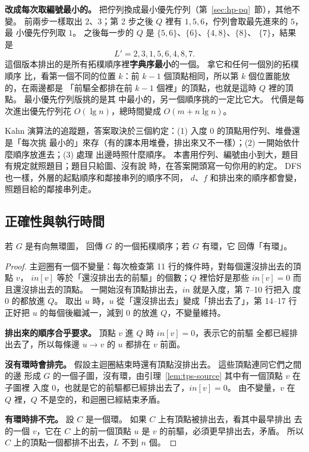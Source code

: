 \textbf{改成每次取編號最小的。} 把佇列換成最小優先佇列（第~\ref{sec:hp-pq}~節），其他不變。
前兩步一樣取出 $2$、$3$；第 2 步之後 $Q$ 裡有 $1, 5, 6$，佇列會取最先進來的 $5$，最
小優先佇列取 $1$。 之後每一步的 $Q$ 是 $\{5, 6\}$、$\{6\}$、$\{4, 8\}$、$\{8\}$、
$\{7\}$，結果是
\[
L' = 2, 3, 1, 5, 6, 4, 8, 7.
\]
這個版本排出的是所有拓樸順序裡\textbf{字典序最小}的一個。 拿它和任何一個別的拓樸順序
比，看第一個不同的位置 $k$：前 $k - 1$ 個頂點相同，所以第 $k$ 個位置能放的，在兩邊都是
「前驅全都排在前 $k - 1$ 個裡」的頂點，也就是這時 $Q$ 裡的頂點。 最小優先佇列版挑的是其
中最小的，另一個順序挑的一定比它大。 代價是每次進出優先佇列花 $O(\lg n)$，總時間變成
$O(m + n \lg n)$。

\begin{examnote}
Kahn 演算法的追蹤題，答案取決於三個約定：(1) 入度 $0$ 的頂點用佇列、堆疊還是「每次挑
最小的」來存（有的課本用堆疊，排出來又不一樣）；(2) 一開始依什麼順序放進去；(3) 處理
出邊時照什麼順序。 本書用佇列、編號由小到大，題目有規定就照題目；題目只給圖、沒有說
時，在答案開頭寫一句你用的約定。 DFS 也一樣，外層的起點順序和鄰接串列的順序不同，
$d$、$f$ 和排出來的順序都會變，照題目給的鄰接串列走。
\end{examnote}

\subsection{正確性與執行時間}

\begin{theorem}
\label{thm:tps-kahn}
若 $G$ 是有向無環圖， 回傳 $G$ 的一個拓樸順序；若 $G$ 有環，它
回傳「有環」。
\end{theorem}

\begin{proof}
主迴圈有一個不變量：每次檢查第 11 行的條件時，對每個還沒排出去的頂點 $v$，
$\mathit{in}[v]$ 等於「還沒排出去的前驅」的個數；$Q$ 裡恰好是那些 $\mathit{in}[v] = 0$
而且還沒排出去的頂點。 一開始沒有頂點排出去，$\mathit{in}$ 就是入度，第 7--10 行把入
度 $0$ 的都放進 $Q$。 取出 $u$ 時，$u$ 從「還沒排出去」變成「排出去了」，第 14--17 行
正好把 $u$ 的每個後繼減一，減到 $0$ 的放進 $Q$，不變量維持。

\textbf{排出來的順序合乎要求。} 頂點 $v$ 進 $Q$ 時 $\mathit{in}[v] = 0$，表示它的前驅
全都已經排出去了，所以每條邊 $u \to v$ 的 $u$ 都排在 $v$ 前面。

\textbf{沒有環時會排完。} 假設主迴圈結束時還有頂點沒排出去。 這些頂點連同它們之間的邊
形成 $G$ 的一個子圖，沒有環，由引理~\ref{lem:tps-source} 其中有一個頂點 $v$ 在子圖裡
入度 $0$，也就是它的前驅都已經排出去了，$\mathit{in}[v] = 0$。 由不變量，$v$ 在 $Q$
裡，$Q$ 不是空的，和迴圈已經結束矛盾。

\textbf{有環時排不完。} 設 $C$ 是一個環。 如果 $C$ 上有頂點被排出去，看其中最早排出
去的一個 $v$，它在 $C$ 上的前一個頂點 $u$ 是 $v$ 的前驅，必須更早排出去，矛盾。 所以
$C$ 上的頂點一個都排不出去，$L$ 不到 $n$ 個。
\end{proof}

